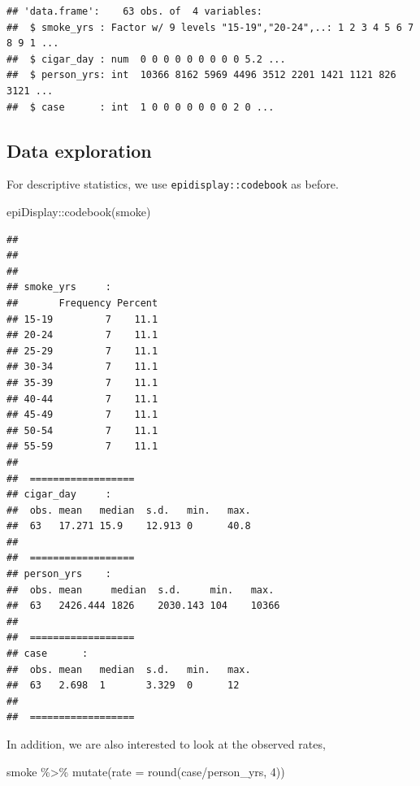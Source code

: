 \documentclass[
  10pt,
]{krantz}
\newenvironment{Shaded}{\begin{snugshade}}{\end{snugshade}}
\newcommand{\AttributeTok}[1]{\textcolor[rgb]{0.77,0.63,0.00}{#1}}
\newcommand{\DecValTok}[1]{\textcolor[rgb]{0.00,0.00,0.81}{#1}}
\newcommand{\FunctionTok}[1]{\textcolor[rgb]{0.00,0.00,0.00}{#1}}
\newcommand{\NormalTok}[1]{#1}
\newcommand{\SpecialCharTok}[1]{\textcolor[rgb]{0.00,0.00,0.00}{#1}}
\begin{document}
\begin{verbatim}
## 'data.frame':    63 obs. of  4 variables:
##  $ smoke_yrs : Factor w/ 9 levels "15-19","20-24",..: 1 2 3 4 5 6 7 8 9 1 ...
##  $ cigar_day : num  0 0 0 0 0 0 0 0 0 5.2 ...
##  $ person_yrs: int  10366 8162 5969 4496 3512 2201 1421 1121 826 3121 ...
##  $ case      : int  1 0 0 0 0 0 0 0 2 0 ...
\end{verbatim}

\hypertarget{data-exploration-3}{%
\subsection{Data exploration}\label{data-exploration-3}}

For descriptive statistics, we use \texttt{epidisplay::codebook} as before.

\begin{Shaded}
\begin{Highlighting}[]
\NormalTok{epiDisplay}\SpecialCharTok{::}\FunctionTok{codebook}\NormalTok{(smoke)}
\end{Highlighting}
\end{Shaded}

\begin{verbatim}
## 
##  
##  
## smoke_yrs     :    
##       Frequency Percent
## 15-19         7    11.1
## 20-24         7    11.1
## 25-29         7    11.1
## 30-34         7    11.1
## 35-39         7    11.1
## 40-44         7    11.1
## 45-49         7    11.1
## 50-54         7    11.1
## 55-59         7    11.1
## 
##  ================== 
## cigar_day     :    
##  obs. mean   median  s.d.   min.   max.  
##  63   17.271 15.9    12.913 0      40.8  
## 
##  ================== 
## person_yrs    :    
##  obs. mean     median  s.d.     min.   max.  
##  63   2426.444 1826    2030.143 104    10366 
## 
##  ================== 
## case      :    
##  obs. mean   median  s.d.   min.   max.  
##  63   2.698  1       3.329  0      12    
## 
##  ==================
\end{verbatim}

In addition, we are also interested to look at the observed rates,

\begin{Shaded}
\begin{Highlighting}[]
\NormalTok{smoke }\SpecialCharTok{\%\textgreater{}\%} \FunctionTok{mutate}\NormalTok{(}\AttributeTok{rate =} \FunctionTok{round}\NormalTok{(case}\SpecialCharTok{/}\NormalTok{person\_yrs, }\DecValTok{4}\NormalTok{))}
\end{Highlighting}
\end{Shaded}
\end{document}

